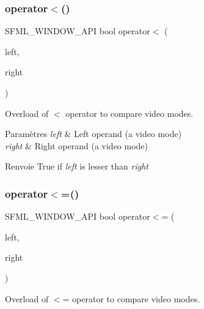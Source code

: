 \subsubsection{\texorpdfstring{operator$<$()}{operator<()}}
{\footnotesize\ttfamily S\+F\+M\+L\+\_\+\+W\+I\+N\+D\+O\+W\+\_\+\+A\+PI bool operator$<$ (\begin{DoxyParamCaption}\item[{const \hyperlink{classsf_1_1VideoMode}{Video\+Mode} \&}]{left,  }\item[{const \hyperlink{classsf_1_1VideoMode}{Video\+Mode} \&}]{right }\end{DoxyParamCaption})\hspace{0.3cm}{\ttfamily [related]}}



Overload of $<$ operator to compare video modes. 


\begin{DoxyParams}{Paramètres}
{\em left} & Left operand (a video mode) \\
\hline
{\em right} & Right operand (a video mode)\\
\hline
\end{DoxyParams}
\begin{DoxyReturn}{Renvoie}
True if {\itshape left} is lesser than {\itshape right} 
\end{DoxyReturn}
\mbox{\label{classsf_1_1VideoMode_a09b0a83f9135d934e540800bad12f0ca}} 
\subsubsection{\texorpdfstring{operator$<$=()}{operator<=()}}
{\footnotesize\ttfamily S\+F\+M\+L\+\_\+\+W\+I\+N\+D\+O\+W\+\_\+\+A\+PI bool operator$<$= (\begin{DoxyParamCaption}\item[{const \hyperlink{classsf_1_1VideoMode}{Video\+Mode} \&}]{left,  }\item[{const \hyperlink{classsf_1_1VideoMode}{Video\+Mode} \&}]{right }\end{DoxyParamCaption})\hspace{0.3cm}{\ttfamily [related]}}



Overload of $<$= operator to compare video modes. 


